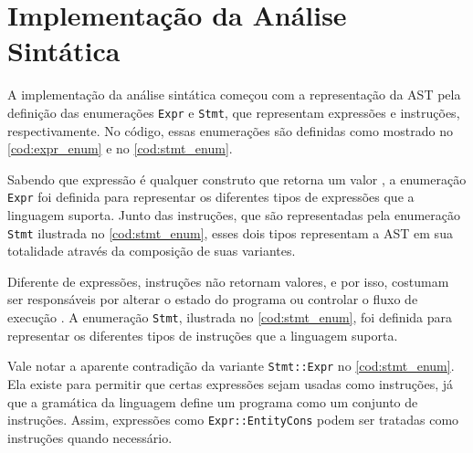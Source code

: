 \section{Implementação da Análise Sintática} \label{sec:analise_sintatica}

A implementação da análise sintática começou com a representação da AST pela definição das enumerações \texttt{Expr} e \texttt{Stmt}, que representam expressões e instruções, respectivamente. No código, essas enumerações são definidas como mostrado no \autoref{cod:expr_enum} e no \autoref{cod:stmt_enum}.

\codigoRust

\vspace{-1em}

Sabendo que expressão é qualquer construto que retorna um valor \cite{craftinginterpreters}, a enumeração \texttt{Expr} foi definida para representar os diferentes tipos de expressões que a linguagem suporta. Junto das instruções, que são representadas pela enumeração \texttt{Stmt} ilustrada no \autoref{cod:stmt_enum}, esses dois tipos representam a AST em sua totalidade através da composição de suas variantes.

Diferente de expressões, instruções não retornam valores, e por isso, costumam ser responsáveis por alterar o estado do programa ou controlar o fluxo de execução \cite{craftinginterpreters}. A enumeração \texttt{Stmt}, ilustrada no \autoref{cod:stmt_enum}, foi definida para representar os diferentes tipos de instruções que a linguagem suporta.

\codigoRust

\vspace{-1em}

Vale notar a aparente contradição da variante \texttt{Stmt::Expr} no \autoref{cod:stmt_enum}. Ela existe para permitir que certas expressões sejam usadas como instruções, já que a gramática da linguagem define um programa como um conjunto de instruções. Assim, expressões como \texttt{Expr::EntityCons} podem ser tratadas como instruções quando necessário.

